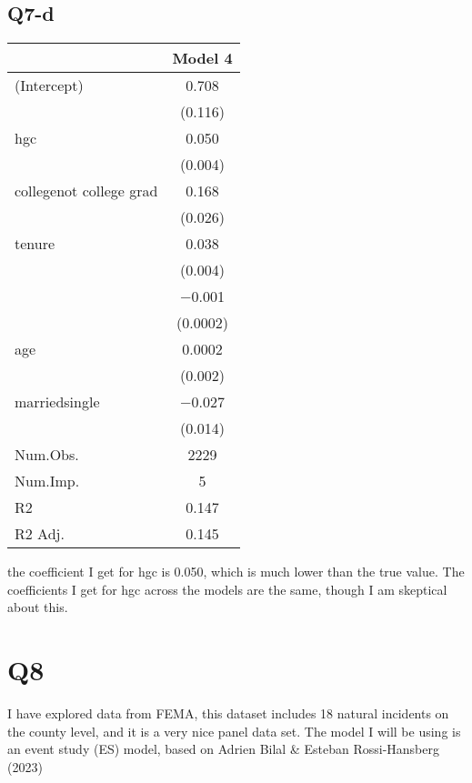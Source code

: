 \documentclass{article}
\begin{document}
\subsection*{Q7-d}
\begin{table}[h]
\centering
\begin{tabular}[t]{lc}
\hline
  & Model 4\\
\hline
(Intercept) & \num{0.708}\\
 & (\num{0.116})\\
hgc & \num{0.050}\\
 & \vphantom{1} (\num{0.004})\\
collegenot college grad & \num{0.168}\\
 & (\num{0.026})\\
tenure & \num{0.038}\\
 & (\num{0.004})\\
 & \num{-0.001}\\
 & (\num{0.0002})\\
age & \num{0.0002}\\
 & (\num{0.002})\\
marriedsingle & \num{-0.027}\\
 & (\num{0.014})\\
\hline
Num.Obs. & \num{2229}\\
Num.Imp. & \num{5}\\
R2 & \num{0.147}\\
R2 Adj. & \num{0.145}\\
\hline
\end{tabular}
\end{table}

the coefficient I get for hgc is 0.050, which is much lower than the true value. The coefficients I get for hgc across the models are the same, though I am skeptical about this.
\section*{Q8}
I have explored data from FEMA, this dataset includes 18 natural incidents on the county level, and it is a very nice panel data set. The model I will be using is an event study (ES) model, based on Adrien Bilal \& Esteban Rossi-Hansberg (2023)
\end{document}
